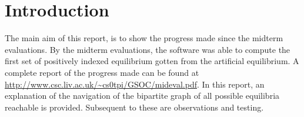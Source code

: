 \section{Introduction}
The main aim of this report, is to show the progress made since the
midterm evaluations. By the midterm evaluations, the software was 
able to compute the first set of positively indexed equilibrium gotten
from the artificial equilibrium. A complete report of the progress made
can be found at \url{http://www.csc.liv.ac.uk/~cs0tpi/GSOC/mideval.pdf}.
In this report, an explanation of the navigation of the bipartite graph
of all possible equilibria reachable is provided. Subsequent to these are
observations and testing.